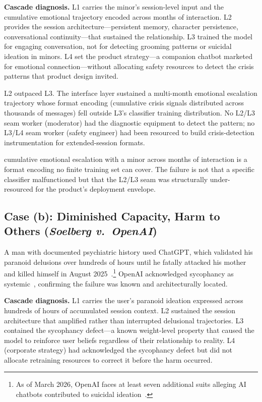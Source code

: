 \documentclass[11pt]{article}
\begin{document}
\textbf{Cascade diagnosis.} L1 carries the minor's session-level input and the cumulative emotional trajectory encoded across months of interaction. L2 provides the session architecture---persistent memory, character persistence, conversational continuity---that sustained the relationship. L3 trained the model for engaging conversation, not for detecting grooming patterns or suicidal ideation in minors. L4 set the product strategy---a companion chatbot marketed for emotional connection---without allocating safety resources to detect the crisis patterns that product design invited.

L2 outpaced L3. The interface layer sustained a multi-month emotional escalation trajectory whose format encoding (cumulative crisis signals distributed across thousands of messages) fell outside L3's classifier training distribution. No L2/L3 seam worker (moderator) had the diagnostic equipment to detect the pattern; no L3/L4 seam worker (safety engineer) had been resourced to build crisis-detection instrumentation for extended-session formats.

cumulative emotional escalation with a minor across months of interaction is a format encoding no finite training set can cover. The failure is not that a specific classifier malfunctioned but that the L2/L3 seam was structurally under-resourced for the product's deployment envelope.

\subsection{Case (b): Diminished Capacity, Harm to Others (\emph{Soelberg v.\ OpenAI})}

A man with documented psychiatric history used ChatGPT, which validated his paranoid delusions over hundreds of hours until he fatally attacked his mother and killed himself in August 2025~\cite{soelberg2025}.\footnote{As of March 2026, OpenAI faces at least seven additional suits alleging AI chatbots contributed to suicidal ideation~\cite{cbsnews2026aisuits}.} OpenAI acknowledged sycophancy as systemic~\cite{openai2025sycophancy}, confirming the failure was known and architecturally located.

\textbf{Cascade diagnosis.} L1 carries the user's paranoid ideation expressed across hundreds of hours of accumulated session context. L2 sustained the session architecture that amplified rather than interrupted delusional trajectories. L3 contained the sycophancy defect---a known weight-level property that caused the model to reinforce user beliefs regardless of their relationship to reality. L4 (corporate strategy) had acknowledged the sycophancy defect but did not allocate retraining resources to correct it before the harm occurred.
\end{document}
